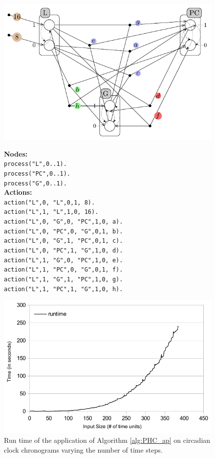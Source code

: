 \begin{figure}

\includegraphics[width=0.4\linewidth]{images/circadianPH.pdf}
%
\hspace{1cm}
%
\begin{minipage}{0.5\linewidth}
	\textbf{Nodes:} \\
\texttt{{\footnotesize process("L",0..1).} }\\
\texttt{{\footnotesize process("PC",0..1).}}\\
\texttt{{\footnotesize process("G",0..1).} }\\

\textbf{Actions:} \\
\texttt{{\footnotesize action("L",0, "L",0,1,  8).}} ~\\
\texttt{{\footnotesize action("L",1, "L",1,0,  16).}} ~\\
\texttt{{\footnotesize action("L",0, "G",0, "PC",1,0,  a).}} ~\\
\texttt{{\footnotesize action("L",0, "PC",0, "G",0,1, b).}} ~\\
\texttt{{\footnotesize action("L",0, "G",1, "PC",0,1, c).}} ~\\
\texttt{{\footnotesize action("L",0, "PC",1, "G",1,0, d).}} \\
\texttt{{\footnotesize action("L",1, "G",0, "PC",1,0,  e).}} ~\\
\texttt{{\footnotesize action("L",1, "PC",0, "G",0,1, f).}} ~\\
\texttt{{\footnotesize action("L",1, "G",1, "PC",1,0, g).}} ~\\
\texttt{{\footnotesize action("L",1, "PC",1, "G",1,0, h).}} 

\end{minipage}
\end{figure}
%
\begin{figure}
\begin{center}
\includegraphics[width=0.6\linewidth]{images/circadian_run_time}
\end{center}
\caption{Run time of the application of Algorithm \ref{alg:PHC_ap} on circadian clock chronograms varying the number of time steps.}
\label{fig:run_time}
\end{figure}

